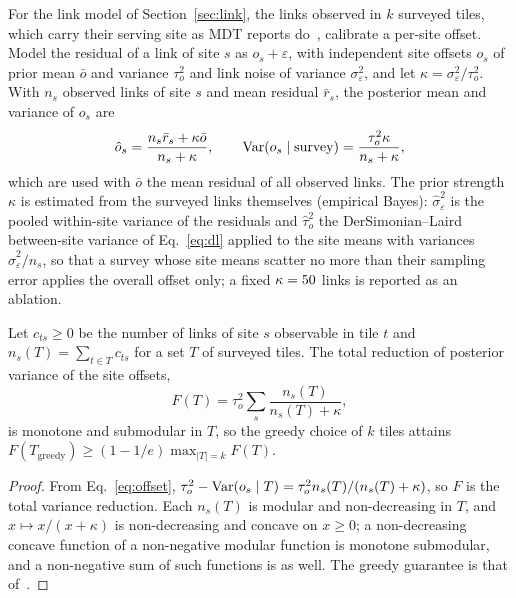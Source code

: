 For the link model of Section~\ref{sec:link}, the links observed in $k$
surveyed tiles, which carry their serving site as MDT reports
do~\cite{johansson2012mdt,ts37320}, calibrate a per-site offset. Model the
residual of a link of site $s$ as $o_s+\varepsilon$, with independent site
offsets $o_s$ of prior mean $\bar o$ and variance $\tau_o^{2}$ and link noise of
variance $\sigma_\varepsilon^{2}$, and let $\kappa=\sigma_\varepsilon^{2}/\tau_o^{2}$.
With $n_s$ observed links of site $s$ and mean residual $\bar r_s$, the
posterior mean and variance of $o_s$ are
\begin{equation}
\hat o_s=\frac{n_s\bar r_s+\kappa\bar o}{n_s+\kappa},\qquad
\operatorname{Var}(o_s\mid\text{survey})=\frac{\tau_o^{2}\kappa}{n_s+\kappa},
\label{eq:offset}
\end{equation}
which are used with $\bar o$ the mean residual of all observed links.
The prior strength $\kappa$ is estimated from the surveyed links themselves
(empirical Bayes): $\hat\sigma_\varepsilon^{2}$ is the pooled within-site
variance of the residuals and $\hat\tau_o^{2}$ the DerSimonian--Laird
between-site variance of Eq.~\eqref{eq:dl} applied to the site means with
variances $\hat\sigma_\varepsilon^{2}/n_s$, so that a survey whose site means
scatter no more than their sampling error applies the overall offset only;
a fixed $\kappa=50{}$ links is reported as an ablation.

\begin{proposition}
\label{prop:survey}
Let $c_{ts}\ge0$ be the number of links of site $s$ observable in tile $t$
and $n_s(T)=\sum_{t\in T}c_{ts}$ for a set $T$ of surveyed tiles. The total
reduction of posterior variance of the site offsets,
\begin{equation}
F(T)=\tau_o^{2}\sum_{s}\frac{n_s(T)}{n_s(T)+\kappa},
\label{eq:survey}
\end{equation}
is monotone and submodular in $T$, so the greedy choice of $k$ tiles attains
$F(T_{\mathrm{greedy}})\ge(1-1/e)\max_{|T|=k}F(T)$.
\end{proposition}
\begin{proof}
From Eq.~\eqref{eq:offset}, $\tau_o^{2}-\operatorname{Var}(o_s\mid T)=\tau_o^{2}n_s(T)/(n_s(T)+\kappa)$,
so $F$ is the total variance reduction. Each $n_s(T)$ is modular and
non-decreasing in $T$, and $x\mapsto x/(x+\kappa)$ is non-decreasing and
concave on $x\ge0$; a non-decreasing concave function of a non-negative
modular function is monotone submodular, and a non-negative sum of such
functions is as well. The greedy guarantee is that
of~\cite{nemhauser1978}.
\end{proof}

